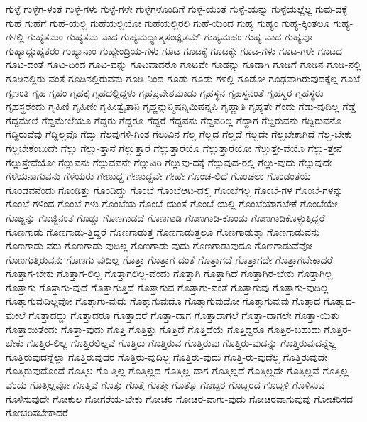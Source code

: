 {ಗುಳ್ಳೆ
ಗುಳ್ಳೆಗ-ಳಂತೆ
ಗುಳ್ಳೆ-ಗಳು
ಗುಳ್ಳೆ-ಗಳೇ
ಗುಳ್ಳೆಗಳೊಂದಿಗೆ
ಗುಳ್ಳೆ-ಯಂತೆ
ಗುಳ್ಳೆ-ಯನ್ನು
ಗುಳ್ಳೆಯಲ್ಲೆಲ್ಲ
ಗುವು-ದಕ್ಕೆ
ಗುಹೆ
ಗುಹೆಗೆ
ಗುಹೆ-ಯಲ್ಲಿ
ಗುಹೆಯಲ್ಲಿಯೋ
ಗುಹೆಯಲ್ಲಿರಲಿ
ಗುಹೆ-ಯಿಂದ
ಗುಹ್ಯ
ಗುಹ್ಯಂ
ಗುಹ್ಯ-ಕ್ಕಿಂತಲೂ
ಗುಹ್ಯ-ಗಳಲ್ಲಿ
ಗುಹ್ಯತಮಂ
ಗುಹ್ಯತಮ-ವಾದ
ಗುಹ್ಯಮಧ್ಯಾತ್ಮಸಂಜ್ಞಿತಮ್
ಗುಹ್ಯಮಹಂ
ಗುಹ್ಯ-ವಾದ
ಗುಹ್ಯವೂ
ಗುಹ್ಯಾದ್ಗುಹ್ಯತರಂ
ಗುಹ್ಯಾನಾಂ
ಗುಹ್ಯೇಂದ್ರಿಯ-ಗಳು
ಗೂಟ
ಗೂಟಕ್ಕೆ
ಗೂಟಕ್ಕೇ
ಗೂಟ-ಗಳು
ಗೂಟ-ಗಳೇ
ಗೂಟದ
ಗೂಟ-ದಂತೆ
ಗೂಟ-ದಿಂದ
ಗೂಟ-ವನ್ನು
ಗೂಟವಾದರೊ
ಗೂಟವೇ
ಗೂಡನ್ನು
ಗೂಡಾಗಿ
ಗೂಡಿಗೆ
ಗೂಡಿನ
ಗೂಡಿ-ನಲ್ಲಿ
ಗೂಡಿನಲ್ಲಿರು-ವಂತೆ
ಗೂಡಿನಲ್ಲಿರುವನು
ಗೂಡಿ-ನಿಂದ
ಗೂಡು
ಗೂಡು-ಗಳಲ್ಲಿ
ಗೂಡೋ
ಗೂಢವಾಗಿರುವುದಕ್ಕೆಲ್ಲ
ಗೂಬೆ
ಗೃಣಂತಿ
ಗೃಹ
ಗೃಹಂ
ಗೃಹಕ್ಕೆ
ಗೃಹದಲ್ಲಿದ್ದಳು
ಗೃಹಪ್ರವೇಶಮಾಡು
ಗೃಹಸ್ಥನ
ಗೃಹಸ್ಥನಂತೆ
ಗೃಹಸ್ಥರ
ಗೃಹಸ್ಥರು
ಗೃಹಸ್ಥರೆಂದು
ಗೃಹಿಣಿ
ಗೃಹಿಣೀ
ಗೃಹೀತ್ವೈತಾನಿ
ಗೃಹ್ಣನ್ನುನ್ಮಿಷನ್ನಿಮಿಷನ್ನಪಿ
ಗೃಹ್ಣಾತಿ
ಗೃಹ್ಯತೇ
ಗೆಂದು
ಗೆಡು-ವುದಿಲ್ಲ
ಗೆಡ್ಡೆ
ಗೆದ್ದಮೇಲೆ
ಗೆದ್ದಮೇಲೆಯೂ
ಗೆದ್ದರು
ಗೆದ್ದರೂ
ಗೆದ್ದರೆ
ಗೆದ್ದವನು
ಗೆದ್ದವರಿಲ್ಲ
ಗೆದ್ದಾಗ
ಗೆದ್ದಿರುವನು
ಗೆದ್ದಿರುವನೊ
ಗೆದ್ದಿರುವೆವು
ಗೆದ್ದಿಲ್ಲವೊ
ಗೆದ್ದು
ಗೆಲವುಗಳಿ-ಗಿಂತ
ಗೆಲುವಿನ
ಗೆಲ್ಲ
ಗೆಲ್ಲದ
ಗೆಲ್ಲದೆ
ಗೆಲ್ಲದೇ
ಗೆಲ್ಲಬೇಕಾಗಿದೆ
ಗೆಲ್ಲ-ಬೇಕು
ಗೆಲ್ಲಬೇಕೆಂಬುದೇ
ಗೆಲ್ಲು
ಗೆಲ್ಲು-ತ್ತಾನೆ
ಗೆಲ್ಲುತ್ತಾರೆ
ಗೆಲ್ಲುತ್ತಾರೆಯೊ
ಗೆಲ್ಲುತ್ತಾರೆಯೋ
ಗೆಲ್ಲುತ್ತೇ-ವೆಯೊ
ಗೆಲ್ಲು-ತ್ತೇನೆ
ಗೆಲ್ಲುತ್ತೇವೆಯೋ
ಗೆಲ್ಲುವನು
ಗೆಲ್ಲುವವನೇ
ಗೆಲ್ಲುವಿರಿ
ಗೆಲ್ಲುವು-ದಕ್ಕೆ
ಗೆಲ್ಲುವುದ-ರಲ್ಲಿ
ಗೆಲ್ಲು-ವುದು
ಗೆಲ್ಲುವುದೇ
ಗೆಳೆಯನಾಗುವನು
ಗೆಳೆಯರು
ಗೇಣುದ್ದ
ಗೇಣುದ್ದವೇ
ಗೇಹೇ
ಗೊಂಚ-ಲಿದೆ
ಗೊಂಚಲು
ಗೊಂಡಂತೆಯೆ
ಗೊಂಡವನೆಂದು
ಗೊಂಡಿತ್ತು
ಗೊಂಡಿದ್ದು
ಗೊಂಬೆ
ಗೊಂಬೆಆಟ-ದಲ್ಲಿ
ಗೊಂಬೆಗಲ್ಲ
ಗೊಂಬೆ-ಗಳ
ಗೊಂಬೆ-ಗಳನ್ನು
ಗೊಂಬೆ-ಗಳಿಂದ
ಗೊಂಬೆ-ಗಳು
ಗೊಂಬೆಯ
ಗೊಂಬೆ-ಯಂತೆ
ಗೊಂಬೆ-ಯಲ್ಲಿ
ಗೊಂಬೆಯಾಗಬೇಕೆ
ಗೊಂಬೆಯೇ
ಗೊಜ್ಜನ್ನು
ಗೊಜ್ಜಿನಂತೆ
ಗೊಡ್ಡು
ಗೊಣಗಾಡದೆ
ಗೊಣಗಾಡಿ
ಗೊಣಗಾಡಿ-ಕೊಂಡು
ಗೊಣಗಾಡಿಕೊಳ್ಳುತ್ತಿದ್ದರೆ
ಗೊಣಗಾಡು
ಗೊಣಗಾಡು-ತ್ತಿದ್ದರೆ
ಗೊಣಗಾಡುತ್ತ
ಗೊಣಗಾಡುತ್ತಲೂ
ಗೊಣಗಾಡುತ್ತಾ
ಗೊಣಗಾಡುವನು
ಗೊಣಗಾಡು-ವರು
ಗೊಣಗಾಡು-ವುದಿಲ್ಲ
ಗೊಣಗಾಡು-ವುದು
ಗೊಣಗಾಡುವುದೂ
ಗೊಣಗಾಡುವೆವೋ
ಗೊಣಗುತ್ತಿರುವನು
ಗೊಣಗು-ವುದಿಲ್ಲ
ಗೊತ್ತಾ
ಗೊತ್ತಾಗ-ದಂತೆ
ಗೊತ್ತಾಗದೆ
ಗೊತ್ತಾಗದೇ
ಗೊತ್ತಾಗಬೇಕಾದರೆ
ಗೊತ್ತಾಗ-ಬೇಕು
ಗೊತ್ತಾಗ-ಲಿಲ್ಲ
ಗೊತ್ತಾಗಲಿಲ್ಲ-ವೆಂದು
ಗೊತ್ತಾಗಿ
ಗೊತ್ತಾಗಿದೆ
ಗೊತ್ತಾಗಿರ-ಬೇಕು
ಗೊತ್ತಾಗಿಲ್ಲ
ಗೊತ್ತಾಗು
ಗೊತ್ತಾಗು-ವುದೆ
ಗೊತ್ತಾಗುತ್ತಿದೆ
ಗೊತ್ತಾಗುವ
ಗೊತ್ತಾಗು-ವಂತೆ
ಗೊತ್ತಾಗುವು
ಗೊತ್ತಾಗು-ವುದಿಲ್ಲ
ಗೊತ್ತಾಗುವುದಿಲ್ಲವೋ
ಗೊತ್ತಾಗು-ವುದು
ಗೊತ್ತಾಗುವುದೊ
ಗೊತ್ತಾಗುವುದೋ
ಗೊತ್ತಾಗುವುವು
ಗೊತ್ತಾದ
ಗೊತ್ತಾದ-ಮೇಲೆ
ಗೊತ್ತಾದದ್ದು
ಗೊತ್ತಾದರೂ
ಗೊತ್ತಾದರೆ
ಗೊತ್ತಾ-ದಾಗ
ಗೊತ್ತಾದಾಗಲೆ
ಗೊತ್ತಾ-ದಾಗಲೇ
ಗೊತ್ತಾ-ಯಿತು
ಗೊತ್ತಾಯಿತೆಂದು
ಗೊತ್ತಾ-ವುದು
ಗೊತ್ತಿ
ಗೊತ್ತಿತ್ತು
ಗೊತ್ತಿದೆ
ಗೊತ್ತಿದೆಯೆ
ಗೊತ್ತಿದ್ದರೂ
ಗೊತ್ತಿರ-ಬಹುದು
ಗೊತ್ತಿರ-ಬೇಕು
ಗೊತ್ತಿರ-ಲಿಲ್ಲ
ಗೊತ್ತಿರಲಿಲ್ಲವೆ
ಗೊತ್ತಿರು
ಗೊತ್ತಿರುವ
ಗೊತ್ತಿರುವು
ಗೊತ್ತಿರು-ವುದನ್ನು
ಗೊತ್ತಿರುವುದನ್ನೆಲ್ಲ
ಗೊತ್ತಿರುವುದನ್ನೆಲ್ಲಾ
ಗೊತ್ತಿರುವುದರ
ಗೊತ್ತಿರು-ವುದಿಲ್ಲ
ಗೊತ್ತಿರು-ವುದು
ಗೊತ್ತಿ-ರು-ವುದೆಲ್ಲ
ಗೊತ್ತಿರುವುದೇ
ಗೊತ್ತಿರುವುದೊಂದೆ
ಗೊತ್ತಿಲ
ಗೊ-ತ್ತಿಲ್ಲ
ಗೊತ್ತಿಲ್ಲದ
ಗೊತ್ತಿಲ್ಲ-ದಾಗ
ಗೊತ್ತಿಲ್ಲದೆ
ಗೊತ್ತಿಲ್ಲದೇ
ಗೊತ್ತಿಲ್ಲವೆ
ಗೊತ್ತಿಲ್ಲ-ವೆಂದು
ಗೊತ್ತಿಲ್ಲವೋ
ಗೊತ್ತಿವೆ
ಗೊತ್ತು
ಗೊತ್ತೆ
ಗೊತ್ತೇ
ಗೊತ್ತೊ
ಗೊಬ್ಬರ
ಗೊಬ್ಬರದ
ಗೊಬ್ಬಳಿ
ಗೊಳಿಸುವ
ಗೊಳಿಸುವುದೇ
ಗೋಕುಲ
ಗೋಗರೆಯ-ಬೇಕು
ಗೋಚರ
ಗೋಚರ-ವಾಗು-ವುದು
ಗೋಚರವಾಗುವುವು
ಗೋಚರಿಸದ
ಗೋಚರಿಸಬೇಕಾದರೆ
}
